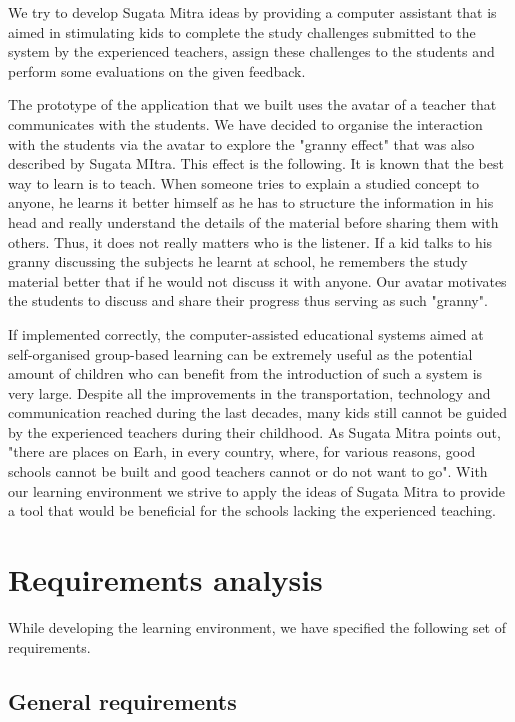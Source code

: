 \documentclass[a4paper]{article}
\begin{document}

We try to develop Sugata Mitra ideas by providing a computer assistant that is aimed in stimulating kids to complete the study challenges submitted to the system by the experienced teachers, assign these challenges to the students and perform some evaluations on the given feedback.

The prototype of the application that we built uses the avatar of a teacher that communicates with the students. We have decided to organise the interaction with the students via the avatar to explore the "granny effect" that was also described by Sugata MItra. This effect is the following. It is known that the best way to learn is to teach. When someone tries to explain a studied concept to anyone, he learns it better himself as he has to structure the information in his head and really understand the details of the material before sharing them with others. Thus, it does not really matters who is the listener. If a kid talks to his granny discussing the subjects he learnt at school, he remembers the study material better that if he would not discuss it with anyone. Our avatar motivates the students to discuss and share their progress thus serving as such "granny".

If implemented correctly, the computer-assisted educational systems aimed at self-organised group-based learning can be extremely useful as the potential amount of children who can benefit from the introduction of such a system is very large. Despite all the improvements in the transportation, technology and communication reached during the last decades, many kids still cannot be guided by the experienced teachers during their childhood. As Sugata Mitra points out, "there are places on Earh, in every country, where, for various reasons, good schools cannot be built and good teachers cannot or do not want to go". With our learning environment we strive to apply the ideas of Sugata Mitra to provide a tool that would be beneficial for the schools lacking the experienced teaching.


\section{Requirements analysis}

While developing the learning environment, we have specified the following set of requirements.

\subsection{General requirements}
\end{document}
